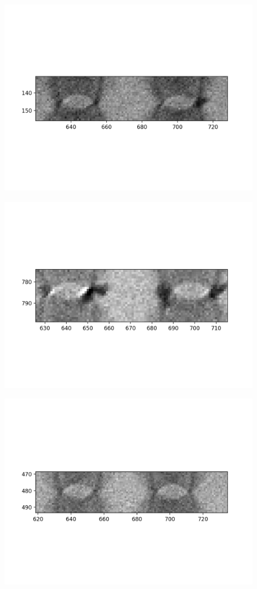 \documentclass[10pt,a4paper]{article}
\begin{document}
	\begin{figure}[h]
		\includegraphics{data/image_stamps/e9}
	\end{figure}
	\begin{figure}[h]
		\includegraphics{data/image_stamps/e10}
	\end{figure}
	\begin{figure}[h]
		\includegraphics{data/image_stamps/e11}
	\end{figure}
\end{document}
